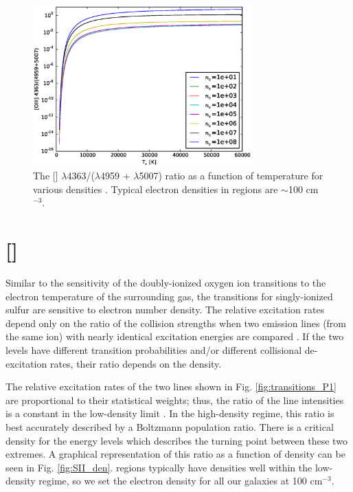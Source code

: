 \begin{figure}
    \includegraphics[width=0.75\textwidth]{Images/Appendix/[OIII]}
    \caption[{[] ratio as a function of temperature}]{The [] 
    $\lambda$4363/($\lambda$4959 + $\lambda$5007) ratio as a function of 
    temperature for various densities \citep{Luridiana15}.  Typical electron 
    densities in  regions are $\sim$100 cm$^{-3}$.}
    \label{fig:OIII_temp}
\end{figure}


\section{[]}

Similar to the sensitivity of the doubly-ionized oxygen ion transitions to the 
electron temperature of the surrounding gas, the transitions for singly-ionized 
sulfur are sensitive to electron number density.  The relative excitation rates 
depend only on the ratio of the collision strengths when two emission lines 
(from the same ion) with nearly identical excitation energies are compared 
\citep{Osterbrock89}.  If the two levels have different transition probabilities 
and/or different collisional de-excitation rates, their ratio depends on the 
density.

The relative excitation rates of the two lines shown in Fig. 
\ref{fig:transitions_P1} are proportional to their statistical weights; thus, the 
ratio of the line intensities is a constant in the low-density limit 
\citep{Osterbrock89}.  In the high-density regime, this ratio is best accurately 
described by a Boltzmann population ratio.  There is a critical density for the 
energy levels which describes the turning point between these two extremes.  A 
graphical representation of this ratio as a function of density can be seen in 
Fig. \ref{fig:SII_den}.   regions typically have densities well within 
the low-density regime, so we set the electron density for all our galaxies at 
100 cm$^{-3}$.

